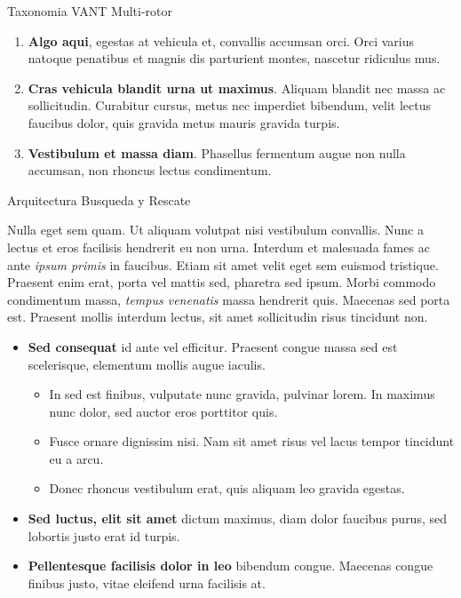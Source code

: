 \documentclass[final]{beamer}
\newlength{\colwidth}
\begin{document}
\begin{frame}[t]
\begin{columns}[t]
\begin{column}{\colwidth}
\begin{block}{Taxonomia VANT Multi-rotor}
    \begin{enumerate}
      \item \textbf{Algo aqui}, egestas at vehicula et, convallis
        accumsan orci. Orci varius natoque penatibus et magnis dis parturient
        montes, nascetur ridiculus mus.
      \item \textbf{Cras vehicula blandit urna ut maximus}. Aliquam blandit nec
        massa ac sollicitudin. Curabitur cursus, metus nec imperdiet bibendum,
        velit lectus faucibus dolor, quis gravida metus mauris gravida turpis.
      \item \textbf{Vestibulum et massa diam}. Phasellus fermentum augue non
        nulla accumsan, non rhoncus lectus condimentum.
    \end{enumerate}

  \end{block}
  
  \begin{block}{Arquitectura Busqueda y Rescate}
    
    Nulla eget sem quam. Ut aliquam volutpat nisi vestibulum convallis. Nunc a
    lectus et eros facilisis hendrerit eu non urna. Interdum et malesuada fames
    ac ante \textit{ipsum primis} in faucibus. Etiam sit amet velit eget sem
    euismod tristique. Praesent enim erat, porta vel mattis sed, pharetra sed
    ipsum. Morbi commodo condimentum massa, \textit{tempus venenatis} massa
    hendrerit quis. Maecenas sed porta est. Praesent mollis interdum lectus,
    sit amet sollicitudin risus tincidunt non.

    \begin{itemize}
    \item \textbf{Sed consequat} id ante vel efficitur. Praesent congue massa
      sed est scelerisque, elementum mollis augue iaculis.
      \begin{itemize}
      \item In sed est finibus, vulputate
        nunc gravida, pulvinar lorem. In maximus nunc dolor, sed auctor eros
        porttitor quis.
      \item Fusce ornare dignissim nisi. Nam sit amet risus vel lacus
        tempor tincidunt eu a arcu.
      \item Donec rhoncus vestibulum erat, quis aliquam leo
        gravida egestas.
      \end{itemize}
    \item \textbf{Sed luctus, elit sit amet} dictum maximus, diam dolor
      faucibus purus, sed lobortis justo erat id turpis.
    \item \textbf{Pellentesque facilisis dolor in leo} bibendum congue.
      Maecenas congue finibus justo, vitae eleifend urna facilisis at.
    \end{itemize}
    

\end{block}
\end{column}
\end{columns}
\end{frame}
\end{document}

